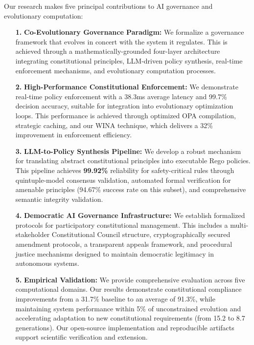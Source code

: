 \documentclass[manuscript,screen,review,anonymous,9pt]{acmart}
\begin{document}
Our research makes five principal contributions to AI governance and evolutionary computation:
\begin{enumerate}[leftmargin=*,itemsep=2pt,parsep=1pt]
    \item[\textbf{1.}] \textbf{Co-Evolutionary Governance Paradigm:} We formalize a governance framework that evolves in concert with the system it regulates. This is achieved through a mathematically-grounded four-layer architecture integrating constitutional principles, LLM-driven policy synthesis, real-time enforcement mechanisms, and evolutionary computation processes.
    
    \item[\textbf{2.}] \textbf{High-Performance Constitutional Enforcement:} We demonstrate real-time policy enforcement with a 38.3ms average latency and 99.7\% decision accuracy, suitable for integration into evolutionary optimization loops. This performance is achieved through optimized OPA compilation, strategic caching, and our WINA technique, which delivers a 32\% improvement in enforcement efficiency.
    
    \item[\textbf{3.}] \textbf{LLM-to-Policy Synthesis Pipeline:} We develop a robust mechanism for translating abstract constitutional principles into executable Rego policies. This pipeline achieves \textbf{99.92\%} reliability for safety-critical rules through quintuple-model consensus validation, automated formal verification for amenable principles (94.67\% success rate on this subset), and comprehensive semantic integrity validation.
    
    \item[\textbf{4.}] \textbf{Democratic AI Governance Infrastructure:} We establish formalized protocols for participatory constitutional management. This includes a multi-stakeholder Constitutional Council structure, cryptographically secured amendment protocols, a transparent appeals framework, and procedural justice mechanisms designed to maintain democratic legitimacy in autonomous systems.
    
    \item[\textbf{5.}] \textbf{Empirical Validation:} We provide comprehensive evaluation across five computational domains. Our results demonstrate constitutional compliance improvements from a 31.7\% baseline to an average of 91.3\%, while maintaining system performance within 5\% of unconstrained evolution and accelerating adaptation to new constitutional requirements (from 15.2 to 8.7 generations). Our open-source implementation and reproducible artifacts support scientific verification and extension.
\end{enumerate}
\end{document}
